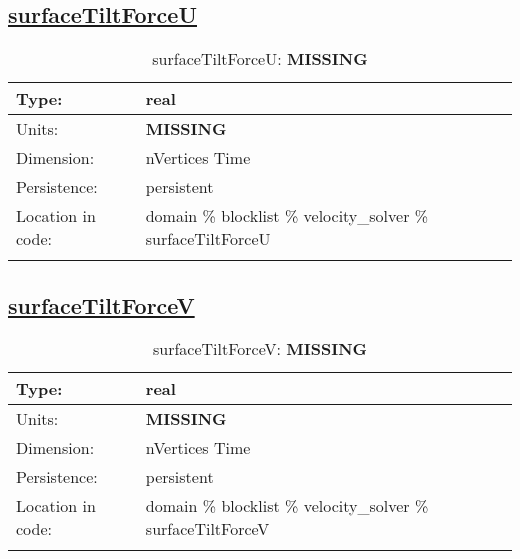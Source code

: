 \subsection[surfaceTiltForceU]{\hyperref[sec:var_tab_velocity_solver]{surfaceTiltForceU}}
\label{subsec:var_sec_velocity_solver_surfaceTiltForceU}
\begin{center}
\begin{longtable}{| p{2.0in} | p{4.0in} |}
        \hline 
        Type: & real \\
        \hline 
        Units: & {\bf \color{red} MISSING} \\
        \hline 
        Dimension: & nVertices Time \\
        \hline 
        Persistence: & persistent \\
        \hline 
         Location in code: & domain \% blocklist \% velocity\_solver \% surfaceTiltForceU \\
         \hline 
    \caption{surfaceTiltForceU: {\bf \color{red} MISSING}}
\end{longtable}
\end{center}
\subsection[surfaceTiltForceV]{\hyperref[sec:var_tab_velocity_solver]{surfaceTiltForceV}}
\label{subsec:var_sec_velocity_solver_surfaceTiltForceV}
\begin{center}
\begin{longtable}{| p{2.0in} | p{4.0in} |}
        \hline 
        Type: & real \\
        \hline 
        Units: & {\bf \color{red} MISSING} \\
        \hline 
        Dimension: & nVertices Time \\
        \hline 
        Persistence: & persistent \\
        \hline 
         Location in code: & domain \% blocklist \% velocity\_solver \% surfaceTiltForceV \\
         \hline 
    \caption{surfaceTiltForceV: {\bf \color{red} MISSING}}
\end{longtable}
\end{center}
